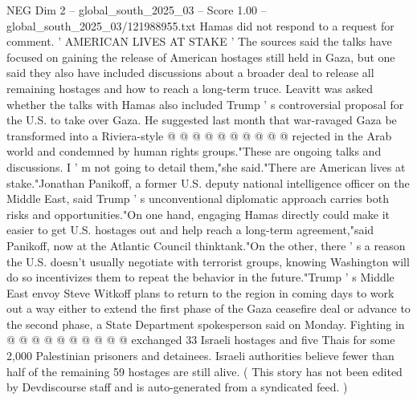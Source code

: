 \begin{textsample}{NEG Dim 2 – global\_south\_2025\_03 – Score 1.00 – global\_south\_2025\_03/121988955.txt}
Hamas did not respond to a request for comment. ' AMERICAN LIVES AT STAKE ' The sources said the talks have focused on gaining the release of American hostages still held in Gaza, but one said they also have included discussions about a broader deal to release all remaining hostages and how to reach a long-term truce.
Leavitt was asked whether the talks with Hamas also included Trump ' s controversial proposal for the U.S. to take over Gaza.
He suggested last month that war-ravaged Gaza be transformed into a Riviera-style @ @ @ @ @ @ @ @ @ @ rejected in the Arab world and condemned by human rights groups."These are ongoing talks and discussions.
I ' m not going to detail them,"she said."There are American lives at stake."Jonathan Panikoff, a former U.S. deputy national intelligence officer on the Middle East, said Trump ' s unconventional diplomatic approach carries both risks and opportunities."On one hand, engaging Hamas directly could make it easier to get U.S. hostages out and help reach a long-term agreement,"said Panikoff, now at the Atlantic Council thinktank."On the other, there ' s a reason the U.S. doesn't usually negotiate with terrorist groups, knowing Washington will do so incentivizes them to repeat the behavior in the future."Trump ' s Middle East envoy Steve Witkoff plans to return to the region in coming days to work out a way either to extend the first phase of the Gaza ceasefire deal or advance to the second phase, a State Department spokesperson said on Monday.
Fighting in @ @ @ @ @ @ @ @ @ @ exchanged 33 Israeli hostages and five Thais for some 2,000 Palestinian prisoners and detainees.
Israeli authorities believe fewer than half of the remaining 59 hostages are still alive. ( This story has not been edited by Devdiscourse staff and is auto-generated from a syndicated feed. )

\end{textsample}

